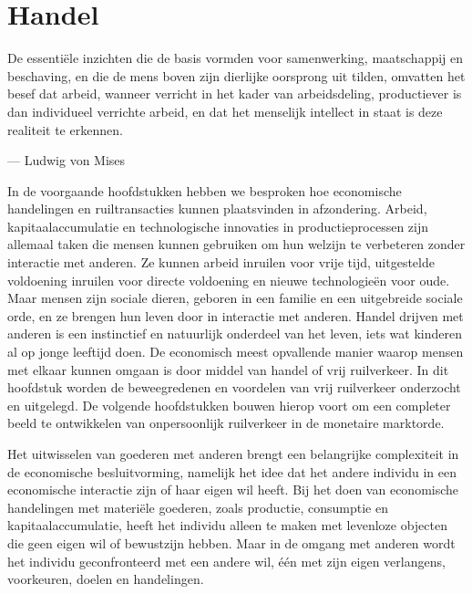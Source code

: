 \hypertarget{handel}{%
\chapter{Handel}\label{handel}}

\begin{blockquotebox}
    De essentiële inzichten die de basis vormden voor samenwerking, maatschappij en beschaving, en die de mens boven zijn dierlijke oorsprong uit tilden, omvatten het besef dat arbeid, wanneer verricht in het kader van arbeidsdeling, productiever is dan individueel verrichte arbeid, en dat het menselijk intellect in staat is deze realiteit te erkennen.\footnotemark
    \par\raggedleft--- Ludwig von Mises
\end{blockquotebox}

In de voorgaande hoofdstukken hebben we besproken hoe economische handelingen en ruiltransacties kunnen plaatsvinden in afzondering. Arbeid, kapitaalaccumulatie en technologische innovaties in productieprocessen zijn allemaal taken die mensen kunnen gebruiken om hun welzijn te verbeteren zonder interactie met anderen. Ze kunnen arbeid inruilen voor vrije tijd, uitgestelde voldoening inruilen voor directe voldoening en nieuwe technologieën voor oude. Maar mensen zijn sociale dieren, geboren in een familie en een uitgebreide sociale orde, en ze brengen hun leven door in interactie met anderen. Handel drijven met anderen is een instinctief en natuurlijk onderdeel van het leven, iets wat kinderen al op jonge leeftijd doen. De economisch meest opvallende manier waarop mensen met elkaar kunnen omgaan is door middel van handel of vrij ruilverkeer. In dit hoofdstuk worden de beweegredenen en voordelen van vrij ruilverkeer onderzocht en uitgelegd. De volgende hoofdstukken bouwen hierop voort om een completer beeld te ontwikkelen van onpersoonlijk ruilverkeer in de monetaire marktorde.

Het uitwisselen van goederen met anderen brengt een belangrijke complexiteit in de economische besluitvorming, namelijk het idee dat het andere individu in een economische interactie zijn of haar eigen wil heeft. Bij het doen van economische handelingen met materiële goederen, zoals productie, consumptie en kapitaalaccumulatie, heeft het individu alleen te maken met levenloze objecten die geen eigen wil of bewustzijn hebben. Maar in de omgang met anderen wordt het individu geconfronteerd met een andere wil, één met zijn eigen verlangens, voorkeuren, doelen en handelingen.


